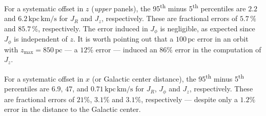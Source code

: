 \documentclass[twocolumn]{aastex62}
\newcommand{\pc}{\text{pc}}
\newcommand{\kms}{\text{km}/\text{s}}
\newcommand{\actunit}{\text{kpc}\,\kms}
\begin{document}
For a systematic offset in $z$ ({\em upper} panels), the
95\textsuperscript{th} minus 5\textsuperscript{th} percentiles are $2.2$ and
$6.2\,\actunit$ for $J_R$ and $J_z$, respectively. These are fractional errors
of $5.7\,\%$ and $85.7\,\%$, respectively. The error induced in $J_{\phi}$ is
negligible, as expected since $J_{\phi}$ is independent of $z$. It is worth
pointing out that a $100\,\pc$ error in an orbit with
$z_{\text{max}}=850\,\pc$ --- a $12\%$ error
--- induced an $86\%$ error in the computation of $J_z$.

For a systematic offset in $x$ (or Galactic center distance), the
95\textsuperscript{th} minus 5\textsuperscript{th} percentiles are $6.9$,
$47$, and $0.71\,\actunit$ for $J_R$, $J_{\phi}$ and $J_z$, respectively.
These are fractional errors of $21\%$, $3.1\%$ and $3.1\%$, respectively ---
despite only a $1.2\%$ error in the distance to the Galactic center.
\end{document}
